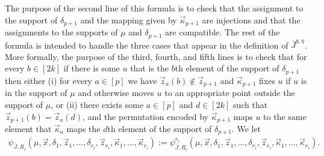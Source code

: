 \documentclass[../main/thesis.tex]{subfiles}
\begin{document}
The purpose of the second line of this formula is to check that the assignment
to the support of $\delta_{p +1}$ and the mapping given by $\vec{\kappa}_{p+1}$
are injections and that the assignments to the supports of $\mu$ and
$\delta_{p+1}$ are compatible. The rest of the formula is intended to handle the
three cases that appear in the definition of $\bar{J}^{g, \eta}$. More formally,
the purpose of the third, fourth, and fifth lines is to check that for every $b
\in [2k]$ if there is some $u$ that is the $b$th element of the support of
$\delta_{p+1}$ then either (i) for every $a \in [p]$ we have $\vec{z}_a(b)
\not\in \vec{z}_{p+1}$ and $\vec{\kappa}_{p+1}$ fixes $u$ if $u$ is in the
support of $\mu$ and otherwise moves $u$ to an appropriate point outside the
support of $\mu$, or (ii) there exists some $a \in [p]$ and $d \in [2k]$ such
that $\vec{z}_{p+1}(b) = \vec{z}_a (d)$, and the permutation encoded by
$\vec{\kappa}_{p+1}$ maps $u$ to the same element that $\vec{\kappa}_{a}$ maps
the $d$th element of the support of $\delta_{p+1}$. We let
\begin{align*}
  \psi_{\bar{J}, R_i} (\mu, \vec{x}, \delta_{1}, \vec{z}_1, \ldots,
  \delta_{r_i}, \vec{z}_{r_i}, \vec{\kappa}_1, \ldots, \vec{\kappa}_{r_i}) :=
  \psi^{r_i}_{\bar{J}, R_i} (\mu, \vec{x}, \delta_{1}, \vec{z}_1, \ldots,
  \delta_{r_i}, \vec{z}_{r_i}, \vec{\kappa}_1, \ldots, \vec{\kappa}_{r_i}).
\end{align*}
\end{document}
